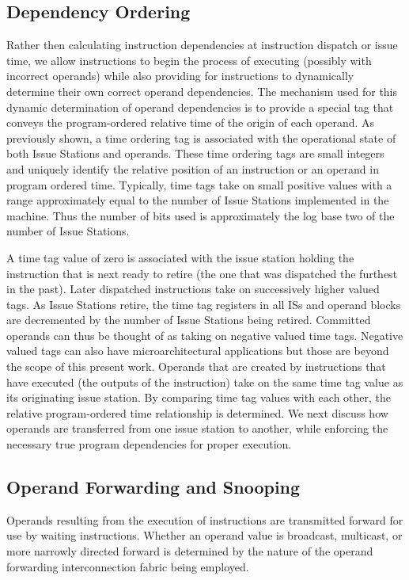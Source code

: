 \documentclass[10pt,dvips]{article}
\begin{document}
\subsection{Dependency Ordering}
%
Rather then calculating instruction dependencies at instruction
dispatch or issue time, we allow instructions to begin
the process of executing (possibly with incorrect operands)
while also providing for instructions to
dynamically determine their own correct
operand dependencies.
The mechanism used for this dynamic determination of
operand dependencies is to provide a special tag that
conveys the program-ordered relative time of the origin of
each operand.
As previously shown,
a time ordering tag is associated
with the operational state of both Issue Stations and operands.
These time ordering tags are small
integers and uniquely identify the relative position of an instruction
or an operand in program ordered time.
Typically, time tags take on small positive values with
a range approximately equal to the 
number of Issue Stations implemented in
the machine.  Thus the number of bits used is approximately
the log base two of the number of Issue Stations.

A time tag value of zero is associated with the
issue station holding the instruction that is next ready
to retire (the one that was dispatched the furthest in the past).
Later dispatched instructions take on successively higher
valued tags.
As Issue Stations retire, the time tag registers in all
ISs and operand blocks are decremented by the
number of Issue Stations being retired.
Committed operands can thus be thought of as taking on
negative valued time tags.  Negative valued tags can also have
microarchitectural applications but those are beyond the
scope of this present work.
Operands that are created by instructions that have executed
(the outputs of the instruction) take on
the same time tag value as its originating issue station.  
By comparing time tag values with each other, the relative
program-ordered time relationship is determined.
We next discuss
how operands are transferred from one
issue station to another, while enforcing the necessary
true program dependencies for proper execution.
%
%
\subsection{Operand Forwarding and Snooping}
%
Operands resulting from the execution of instructions
are transmitted forward for use by waiting instructions.
Whether an operand value is broadcast, multicast, or more narrowly
directed forward
is determined by the nature of the operand forwarding interconnection
fabric being employed.
\end{document}
